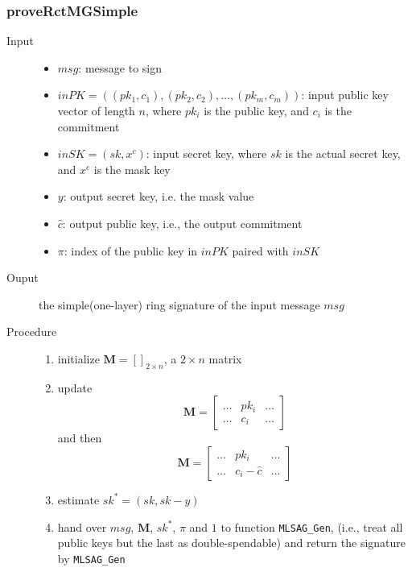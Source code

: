 \subsubsection{proveRctMGSimple} 
	\begin{description}
		\item[Input]
			\begin{itemize}
				\item \(msg\): message to sign
				\item \(inPK=\left((pk_1,c_1),(pk_2,c_2),\dots,(pk_m,c_m)\right)\): input public key vector of length \(n\), where \(pk_i\) is the public key, and \(c_i\) is the commitment
				\item \(inSK=(sk,x^c)\): input secret key, where \(sk\) is the actual secret key, and \(x^c\) is the mask key
				\item \(y\): output secret key, i.e. the mask value
				\item \(\hat{c}\): output public key, i.e., the output commitment
				\item \(\pi\): index of the public key in \(inPK\) paired with \(inSK\)
			\end{itemize}
		\item[Ouput] the simple(one-layer) ring signature of the input message \(msg\)
		\item[Procedure]
			\begin{enumerate}
				\item initialize \(\mathbf{M}=[ ]_{2\times n}\), a \(2\times n\) matrix
				\item update 
					\[
						\mathbf{M}=
						\begin{bmatrix}
							\dots &pk_i &\dots \\
							\dots &c_i &\dots
						\end{bmatrix}
					\]
					and then
					\[
						\mathbf{M}=
						\begin{bmatrix}
							\dots &pk_i &\dots \\
							\dots &c_i-\hat{c} &\dots
						\end{bmatrix}
					\]
				\item estimate \(sk^*=(sk,sk-y)\)
				\item hand over \(msg\), \(\mathbf{M}\), \(sk^*\), \(\pi\) and \(1\) to function \texttt{MLSAG\_Gen}, (i.e., treat all public keys but the last as double-spendable) and return the signature by \texttt{MLSAG\_Gen}
			\end{enumerate}
	\end{description}
